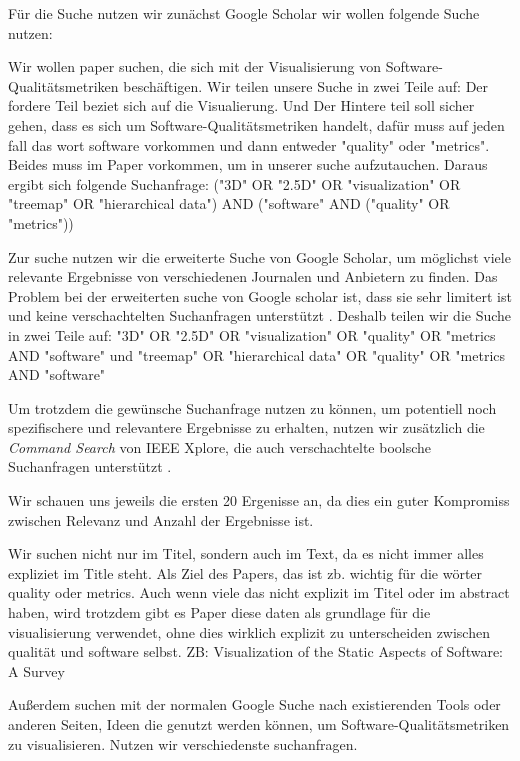 Für die Suche nutzen wir zunächst Google Scholar wir wollen folgende Suche nutzen:

Wir wollen paper suchen, die sich mit der Visualisierung von Software-Qualitätsmetriken beschäftigen.
Wir teilen unsere Suche in zwei Teile auf:
Der fordere Teil beziet sich auf die Visualierung.
Und 
Der Hintere teil soll sicher gehen, dass es sich um Software-Qualitätsmetriken handelt, dafür muss auf jeden fall das wort software vorkommen und dann entweder "quality" oder "metrics". 
Beides muss im Paper vorkommen, um in unserer suche aufzutauchen.
Daraus ergibt sich folgende Suchanfrage:
("3D" OR "2.5D" OR "visualization" OR "treemap" OR "hierarchical data") AND ("software" AND ("quality" OR "metrics"))

Zur suche nutzen wir die erweiterte Suche von Google Scholar, um möglichst viele relevante Ergebnisse von verschiedenen Journalen und Anbietern zu finden.
Das Problem bei der erweiterten suche von Google scholar ist, dass sie sehr limitert ist und keine verschachtelten Suchanfragen unterstützt \cite{scholar_queries_2023}.
Deshalb teilen wir die Suche in zwei Teile auf: 
"3D" OR "2.5D" OR "visualization" OR "quality" OR "metrics AND "software"
und 
"treemap" OR "hierarchical data" OR "quality" OR "metrics AND "software"

Um trotzdem die gewünsche Suchanfrage nutzen zu können, um potentiell noch spezifischere und relevantere Ergebnisse zu erhalten, nutzen wir zusätzlich die \textit{Command Search} von IEEE Xplore, die auch verschachtelte boolsche Suchanfragen unterstützt \cite{ieee_xplore_boolean_2025}.

Wir schauen uns jeweils die ersten 20 Ergenisse an, da dies ein guter Kompromiss zwischen Relevanz und Anzahl der Ergebnisse ist.

Wir suchen nicht nur im Titel, sondern auch im Text, da es nicht immer alles expliziet im Title steht. 
Als Ziel des Papers, das ist zb. wichtig für die wörter quality oder metrics. Auch wenn viele das nicht explizit im Titel oder im abstract haben, wird trotzdem gibt es Paper diese daten als grundlage für die visualisierung verwendet, ohne dies wirklich explizit zu unterscheiden zwischen qualität und software selbst. ZB: Visualization of the Static Aspects of Software: A Survey

Außerdem suchen mit der normalen Google Suche nach existierenden Tools oder anderen Seiten, Ideen die genutzt werden können, um Software-Qualitätsmetriken zu visualisieren. Nutzen wir verschiedenste suchanfragen.

